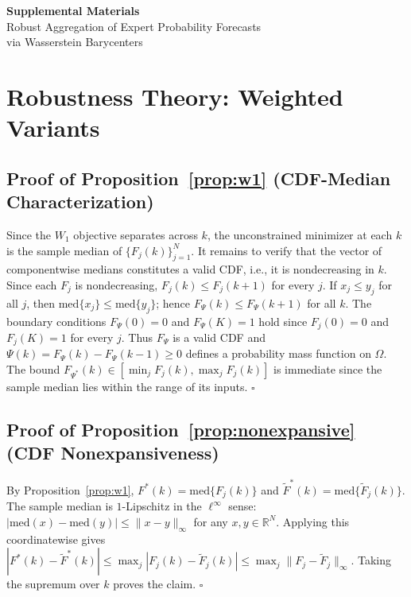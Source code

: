 \appendix
\renewcommand{\thesection}{S\arabic{section}}
\setcounter{section}{0}

\clearpage
\begin{center}
  {\LARGE\bfseries Supplemental Materials}\\[0.5em]
  {\large Robust Aggregation of Expert Probability Forecasts\\
         via Wasserstein Barycenters}
\end{center}
\vspace{1em}


\section{Robustness Theory: Weighted Variants}
\label{app:robustness}

\subsection*{Proof of Proposition~\ref{prop:w1} (CDF-Median Characterization)}

Since the $W_1$ objective separates across $k$, the unconstrained minimizer at each $k$ is the
sample median of $\{F_j(k)\}_{j=1}^N$.  It remains to verify that the vector of
componentwise medians constitutes a valid CDF, i.e., it is nondecreasing in $k$.  Since each
$F_j$ is nondecreasing, $F_j(k)\le F_j(k+1)$ for every $j$.  If $x_j\le y_j$ for all $j$,
then $\mathrm{med}\{x_j\}\le\mathrm{med}\{y_j\}$; hence $F_\Psi(k)\le F_\Psi(k+1)$ for all
$k$.  The boundary conditions $F_\Psi(0)=0$ and $F_\Psi(K)=1$ hold since $F_j(0)=0$ and
$F_j(K)=1$ for every $j$.  Thus $F_\Psi$ is a valid CDF and $\Psi(k)=F_\Psi(k)-F_\Psi(k-1)\ge 0$
defines a probability mass function on $\Omega$.  The bound $F_{\Psi^*}(k)\in[\min_j F_j(k),\max_j F_j(k)]$
is immediate since the sample median lies within the range of its inputs. \hfill$\square$

\subsection*{Proof of Proposition~\ref{prop:nonexpansive} (CDF Nonexpansiveness)}

By Proposition~\ref{prop:w1}, $F^*(k) = \mathrm{med}\{F_j(k)\}$ and
$\tilde F^*(k)=\mathrm{med}\{\tilde F_j(k)\}$.  The sample median is $1$-Lipschitz in the
$\ell^\infty$ sense: $|\mathrm{med}(x) - \mathrm{med}(y)|\leq\|x-y\|_\infty$ for any
$x,y\in\mathbb{R}^N$.  Applying this coordinatewise gives
$|F^*(k)-\tilde F^*(k)|\leq\max_j|F_j(k)-\tilde F_j(k)|\leq\max_j\|F_j-\tilde F_j\|_\infty$.
Taking the supremum over $k$ proves the claim. \hfill$\square$

